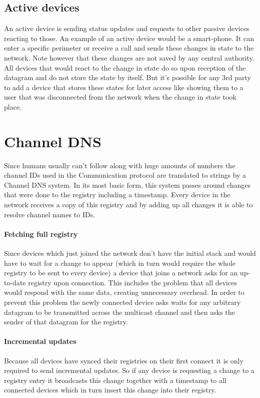 \documentclass[a4paper]{article}
\begin{document}
        \subsection{Active devices}
            An active device is sending status updates and requests to other passive devices reacting to those. An
            example of an active device would be a smart-phone. It can enter a specific perimeter or receive a call and
            sends these changes in state to the network. Note however that these changes are not saved by any
            central authority. All devices that would react to the change in state do so upon reception of the datagram
            and do not store the state by itself. But it's possible for any 3rd party to add a device that stores these
            states for later access like showing them to a user that was disconnected from the network when the change
            in state took place.
	\section{Channel DNS}
	    Since humans usually can't follow along with huge amounts of numbers the channel IDs used in the Communication
	    protocol are translated to strings by a Channel DNS system. In its most basic form, this system passes around
	    changes that were done to the registry including a timestamp. Every device in the network receives a
	    copy of this registry and by adding up all changes it is able to resolve channel names to IDs.
	    \paragraph{Fetching full registry} Since devices which just joined the network don't have the initial stack and
	        would have to wait for a change to appear (which in turn would require the whole registry to be sent to
	        every device) a device that joins a network asks for an up-to-date registry upon connection. This
	        includes the problem that all devices would respond with the same data, creating unnecessary overhead. In
	        order to prevent this problem the newly connected device asks waits for any arbitrary datagram to be
	        transmitted across the multicast channel and then asks the sender of that datagram for the registry.
        \paragraph{Incremental updates}  Because all devices have synced their registries on their first connect it is
            only required to send incremental updates. So if any device is requesting a change to a registry entry it
            broadcasts this change together with a timestamp to all connected devices which in turn insert this change
            into their registry.
\end{document}
